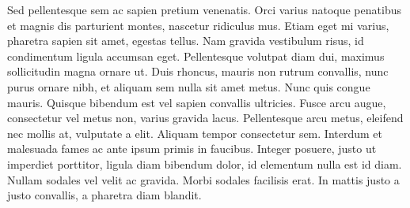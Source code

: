 \documentclass[10pt,twocolumn]{article}
\begin{document}
Sed pellentesque sem ac sapien pretium venenatis. Orci varius natoque penatibus et magnis dis parturient montes, nascetur ridiculus mus. Etiam eget mi varius, pharetra sapien sit amet, egestas tellus. Nam gravida vestibulum risus, id condimentum ligula accumsan eget. Pellentesque volutpat diam dui, maximus sollicitudin magna ornare ut. Duis rhoncus, mauris non rutrum convallis, nunc purus ornare nibh, et aliquam sem nulla sit amet metus. Nunc quis congue mauris. Quisque bibendum est vel sapien convallis ultricies. Fusce arcu augue, consectetur vel metus non, varius gravida lacus. Pellentesque arcu metus, eleifend nec mollis at, vulputate a elit. Aliquam tempor consectetur sem. Interdum et malesuada fames ac ante ipsum primis in faucibus. Integer posuere, justo ut imperdiet porttitor, ligula diam bibendum dolor, id elementum nulla est id diam. Nullam sodales vel velit ac gravida. Morbi sodales facilisis erat. In mattis justo a justo convallis, a pharetra diam blandit. 
\end{document}
